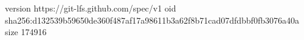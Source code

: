 version https://git-lfs.github.com/spec/v1
oid sha256:d132539b59650de360f487af17a98611b3a62f8b71cad07dfdbbf0fb3076a40a
size 174916
